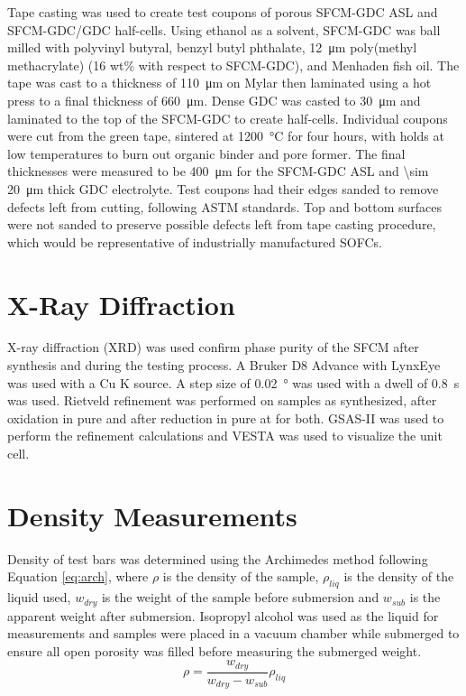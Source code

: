         Tape casting was used to create test coupons of porous SFCM-GDC ASL and SFCM-GDC/GDC half-cells.
        Using ethanol as a solvent, SFCM-GDC was ball milled with polyvinyl butyral, benzyl butyl phthalate, \SI{12}{\micro\meter} poly(methyl methacrylate) (16 wt\% with respect to SFCM-GDC), and Menhaden fish oil.
        The tape was cast to a thickness of \SI{110}{\micro\meter} on Mylar then laminated using a hot press to a final thickness of \SI{660}{\micro\meter}.
        Dense GDC was casted to \SI{30}{\micro\meter} and laminated to the top of the SFCM-GDC to create half-cells.
        Individual coupons were cut from the green tape, sintered at \SI{1200}{\celsius} for four hours, with holds at low temperatures to burn out organic binder and pore former.
        The final thicknesses were measured to be \SI{400}{\micro\meter} for the SFCM-GDC ASL and \SI{\sim 20}{\micro\meter} thick GDC electrolyte.
        Test coupons had their edges sanded to remove defects left from cutting, following ASTM standards.\cite{ASTM2008}
        Top and bottom surfaces were not sanded to preserve possible defects left from tape casting procedure, which would be representative of industrially manufactured SOFCs.

\section{X-Ray Diffraction}
    X-ray diffraction (XRD) was used confirm phase purity of the SFCM after synthesis and during the testing process.
    A Bruker D8 Advance with LynxEye was used with a Cu K\textsubscript{\textalpha{}} source.
    A step size of \SI{0.02}{\degree} was used with a dwell of \SI{0.8}{\second} was used.
    Rietveld refinement was performed on samples as synthesized, after oxidation in pure  and after reduction in pure  at  for both.
    GSAS-II was used to perform the refinement calculations and VESTA was used to visualize the unit cell.\cite{Toby2013,Momma2011}

\section{Density Measurements}
    Density of test bars was determined using the Archimedes method following Equation \ref{eq:arch}, where $\rho$ is the density of the sample, $\rho_{liq}$ is the density of the liquid used, $w_{dry}$ is the weight of the sample before submersion and $w_{sub}$ is the apparent weight after submersion.
    Isopropyl alcohol was used as the liquid for measurements and samples were placed in a vacuum chamber while submerged to ensure all open porosity was filled before measuring the submerged weight.
    \begin{equation}
    \rho = \frac{w_{dry}}{w_{dry}-w_{sub}}\rho_{liq}
    \label{eq:arch}
    \end{equation}

